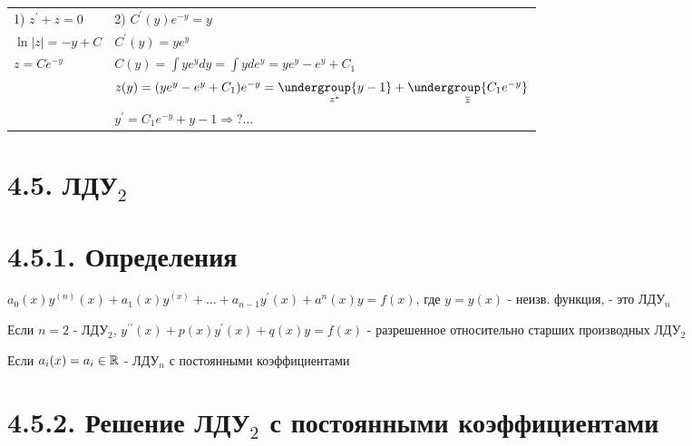 \documentclass[12pt]{article}
\begin{document}
    \begin{tabular}{p{5cm}p{10cm}}
        1) $z^\prime + z = 0$ & 2) $C^\prime (y) e^{-y} = y$                                                                                              \\

        $\ln|z| = -y + C$     & $C^\prime (y) = ye^{y}$                                                                                                   \\

        $z = Ce^{-y}$         & $C(y) = \int y e^y dy = \int y de^y = ye^y - e^y + C_1$                                                                   \\

        & $z(y) = (ye^y - e^y + C_1)e^{-y} = \underset{z^*}{\undergroup{y - 1}} + \underset{\overline{z}}{\undergroup{C_1 e^{-y}}}$ \\

        & $y^\prime = C_1 e^{-y} + y - 1 \Longrightarrow ? \dots $

    \end{tabular}


    \section{4.5. ЛДУ$_2$}

    \hypertarget{lineardifferentialequationhigherdegree}{}

    \section{4.5.1. Определения}

    \Def $a_0(x) y^{(n)}(x) + a_1(x)y^{(x)} + \dots + a_{n - 1}y^\prime(x) + a^n(x)y = f(x)$, где $y = y(x)$ - неизв. функция, - это ЛДУ$_n$

    \Nota Если $n = 2$ - ЛДУ$_2$, $y^{\prime\prime}(x) + p(x)y^\prime(x) + q(x)y = f(x)$ - разрешенное относительно старших производных ЛДУ$_2$

    \Nota Если $a_i(x) = a_i \in \mathbb{R}$ - ЛДУ$_n$ с постоянными коэффициентами

    \hypertarget{lineardifferentialequationseconddegreewithconstants}{}

    \section{4.5.2. Решение ЛДУ$_2$ с постоянными коэффициентами}
\end{document}
